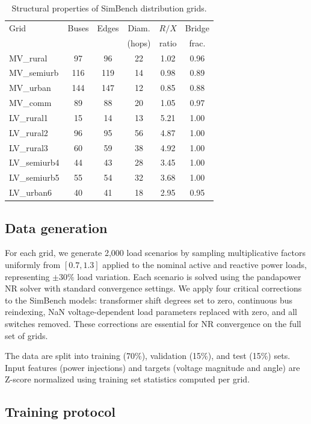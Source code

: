 \documentclass[preprint,review,12pt]{elsarticle}
\begin{document}
\begin{table}[!t]
\renewcommand{\arraystretch}{1.1}
\caption{Structural properties of SimBench distribution grids.}
\label{tab:grids}
\centering
\begin{tabular}{lccccc}
\toprule
Grid & Buses & Edges & Diam. & $R/X$ & Bridge \\
 & & & (hops) & ratio & frac. \\
\midrule
MV\_rural & 97 & 96 & 22 & 1.02 & 0.96 \\
MV\_semiurb & 116 & 119 & 14 & 0.98 & 0.89 \\
MV\_urban & 144 & 147 & 12 & 0.85 & 0.88 \\
MV\_comm & 89 & 88 & 20 & 1.05 & 0.97 \\
LV\_rural1 & 15 & 14 & 13 & 5.21 & 1.00 \\
LV\_rural2 & 96 & 95 & 56 & 4.87 & 1.00 \\
LV\_rural3 & 60 & 59 & 38 & 4.92 & 1.00 \\
LV\_semiurb4 & 44 & 43 & 28 & 3.45 & 1.00 \\
LV\_semiurb5 & 55 & 54 & 32 & 3.68 & 1.00 \\
LV\_urban6 & 40 & 41 & 18 & 2.95 & 0.95 \\
\bottomrule
\end{tabular}
\end{table}

\subsection{Data generation}

For each grid, we generate 2,000 load scenarios by sampling multiplicative factors uniformly from $[0.7, 1.3]$ applied to the nominal active and reactive power loads, representing $\pm 30\%$ load variation. Each scenario is solved using the pandapower NR solver \cite{b24} with standard convergence settings. We apply four critical corrections to the SimBench models: transformer shift degrees set to zero, continuous bus reindexing, NaN voltage-dependent load parameters replaced with zero, and all switches removed. These corrections are essential for NR convergence on the full set of grids.

The data are split into training (70\%), validation (15\%), and test (15\%) sets. Input features (power injections) and targets (voltage magnitude and angle) are Z-score normalized using training set statistics computed per grid.

\subsection{Training protocol}
\end{document}
